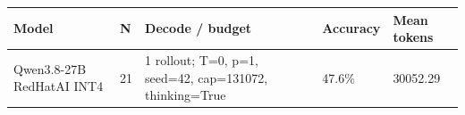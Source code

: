 \begin{tabular}{lllll}
\hline
Model & N & Decode / budget & Accuracy & Mean tokens \\
\hline
Qwen3.8-27B RedHatAI INT4 & 21 & 1 rollout; T=0, p=1, seed=42, cap=131072, thinking=True & 47.6\% & 30052.29 \\
\hline
\end{tabular}
